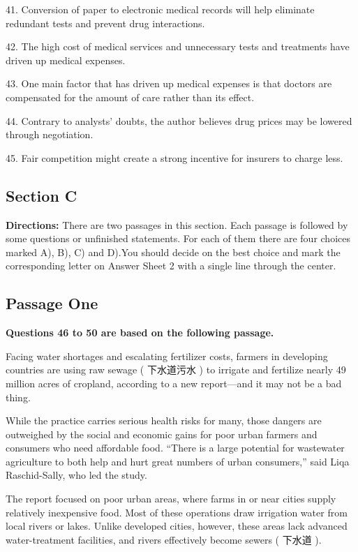 \documentclass[UTF8,11pt]{ctexart}
\begin{document}
41. Conversion of paper to electronic medical records will help eliminate redundant tests and prevent drug interactions.


42. The high cost of medical services and unnecessary tests and treatments have driven up medical expenses.


43. One main factor that has driven up medical expenses is that doctors are compensated for the amount of care rather than its effect.


44. Contrary to analysts’ doubts, the author believes drug prices may be lowered through negotiation.


45. Fair competition might create a strong incentive for insurers to charge less.


\subsection*{\textbf{Section C}}


\textbf{Directions:} There are two passages in this section. Each passage is followed by some questions or unfinished statements. For each of them there are four choices marked A), B), C) and D).You should decide on the best choice and mark the corresponding letter on Answer Sheet 2 with a single line through the center.


\subsection*{\textbf{Passage One}}


\textbf{Questions 46 to 50 are based on the following passage.}


Facing water shortages and escalating fertilizer costs, farmers in developing countries are using raw sewage ( 下水道污水 ) to irrigate and fertilize nearly 49 million acres of cropland, according to a new report—and it may not be a bad thing.


While the practice carries serious health risks for many, those dangers are outweighed by the social and economic gains for poor urban farmers and consumers who need affordable food. “There is a large potential for wastewater agriculture to both help and hurt great numbers of urban consumers,” said Liqa Raschid-Sally, who led the study.


The report focused on poor urban areas, where farms in or near cities supply relatively inexpensive food. Most of these operations draw irrigation water from local rivers or lakes. Unlike developed cities, however, these areas lack advanced water-treatment facilities, and rivers effectively become sewers ( 下水道 ).
\end{document}
